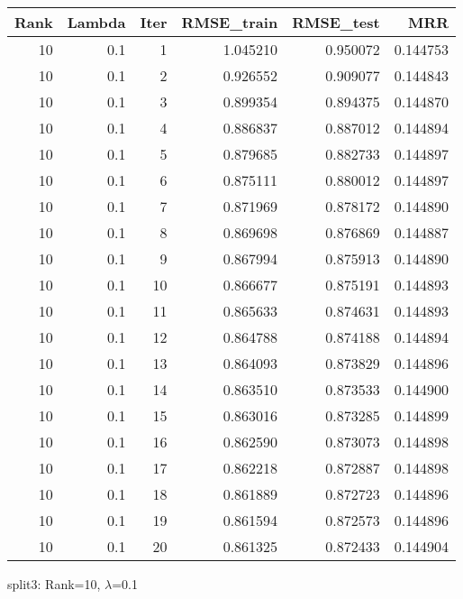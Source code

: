 \begin{tabular}{rrrrrr}
\toprule
 Rank &  Lambda &  Iter &  RMSE\_train &  RMSE\_test &       MRR \\
\midrule
   10 &     0.1 &     1 &    1.045210 &   0.950072 &  0.144753 \\
   10 &     0.1 &     2 &    0.926552 &   0.909077 &  0.144843 \\
   10 &     0.1 &     3 &    0.899354 &   0.894375 &  0.144870 \\
   10 &     0.1 &     4 &    0.886837 &   0.887012 &  0.144894 \\
   10 &     0.1 &     5 &    0.879685 &   0.882733 &  0.144897 \\
   10 &     0.1 &     6 &    0.875111 &   0.880012 &  0.144897 \\
   10 &     0.1 &     7 &    0.871969 &   0.878172 &  0.144890 \\
   10 &     0.1 &     8 &    0.869698 &   0.876869 &  0.144887 \\
   10 &     0.1 &     9 &    0.867994 &   0.875913 &  0.144890 \\
   10 &     0.1 &    10 &    0.866677 &   0.875191 &  0.144893 \\
   10 &     0.1 &    11 &    0.865633 &   0.874631 &  0.144893 \\
   10 &     0.1 &    12 &    0.864788 &   0.874188 &  0.144894 \\
   10 &     0.1 &    13 &    0.864093 &   0.873829 &  0.144896 \\
   10 &     0.1 &    14 &    0.863510 &   0.873533 &  0.144900 \\
   10 &     0.1 &    15 &    0.863016 &   0.873285 &  0.144899 \\
   10 &     0.1 &    16 &    0.862590 &   0.873073 &  0.144898 \\
   10 &     0.1 &    17 &    0.862218 &   0.872887 &  0.144898 \\
   10 &     0.1 &    18 &    0.861889 &   0.872723 &  0.144896 \\
   10 &     0.1 &    19 &    0.861594 &   0.872573 &  0.144896 \\
   10 &     0.1 &    20 &    0.861325 &   0.872433 &  0.144904 \\
\bottomrule
\end{tabular}

\caption{split3: Rank=10, $\lambda$=0.1}
